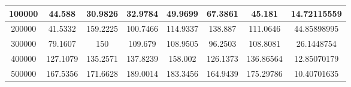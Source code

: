 \documentclass{article}
\begin{document}
\begin{table}[]
\begin{tabular}{|c|c|c|c|c|c|c|c| }
                100000	&44.588	&30.9826	&32.9784	&49.9699	&67.3861	&45.181	&14.72115559\\ \hline
                200000	&41.5332	&159.2225	&100.7466	&114.9337	&138.887	&111.0646	&44.85898995\\ \hline
                300000	&79.1607	&150	&109.679	&108.9505	&96.2503	&108.8081	&26.1448754\\ \hline
                400000	&127.1079	&135.2571&	137.8239	&158.002&	126.1373&	136.86564	&12.85070179\\ \hline
                500000	&167.5356	&171.6628&	189.0014	&183.3456	&164.9439	&175.29786&	10.40701635\\ \hline
        \end{tabular}
    \end{table}
\end{document}

